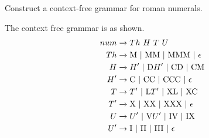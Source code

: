 \begin{exercise}\label{ex:020206}
    Construct a context-free grammar for roman numerals.
\end{exercise}
\begin{solution}\label{sol:020206}
    The context free grammar is as shown.
    \begin{align*}
        num &\xrightarrow{} Th\ H\ T\ U \\
        Th &\xrightarrow{} \textrm{M | MM | MMM | } \epsilon \\
        H &\xrightarrow{} H'\ | \textrm{ D}H'\ \textrm{| CD | CM} \\
        H' &\xrightarrow{} \textrm{C | CC | CCC | } \epsilon \\
        T &\xrightarrow{} T'\ | \textrm{ L}T'\ \textrm{| XL | XC} \\
        T' &\xrightarrow{} \textrm{X | XX | XXX | } \epsilon \\
        U &\xrightarrow{} U'\ | \textrm{ V}U'\ \textrm{| IV | IX} \\
        U' &\xrightarrow{} \textrm{I | II | III | } \epsilon
    \end{align*}
\end{solution}